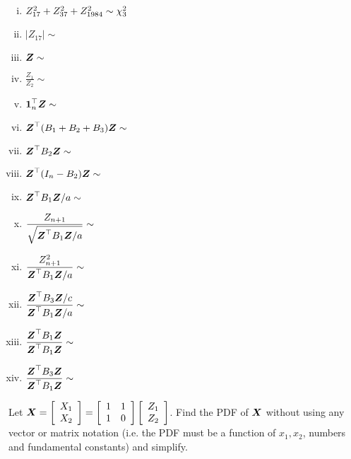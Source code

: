 \documentclass[12pt]{article}
\begin{document}
\begin{multicols}{2}
\begin{enumerate}[i)]
\item $Z_{17}^2 + Z_{37}^2  + Z_{1984}^2 \sim \chi^2_{3}$ \\
\item $|Z_{17}| \sim $ \\
\item $\boldsymbol{Z} \sim$ \\
\item $\displaystyle\frac{Z_1}{Z_2} \sim$ \\
\item $\boldsymbol{1}_n^\top \boldsymbol{Z} \sim$ \\
\item $\boldsymbol{Z}^\top (B_1 + B_2 + B_3) \boldsymbol{Z} \sim$ \\
\item $\boldsymbol{Z}^\top B_2 \boldsymbol{Z} \sim$ \\
\item $\boldsymbol{Z}^\top (I_n - B_2) \boldsymbol{Z} \sim$ \\
\item $\boldsymbol{Z}^\top B_1 \boldsymbol{Z} / a \sim$ \\
\item $\displaystyle\frac{Z_{n+1}}{\sqrt{\boldsymbol{Z}^\top B_1 \boldsymbol{Z} / a}} \sim$ \\
\item $\displaystyle\frac{Z_{n+1}^2}{\boldsymbol{Z}^\top B_1 \boldsymbol{Z} / a} \sim$ \\
\item $\displaystyle\frac{\boldsymbol{Z}^\top B_3 \boldsymbol{Z} / c}{\boldsymbol{Z}^\top B_1 \boldsymbol{Z} / a} \sim$ \\
\item $\displaystyle\frac{\boldsymbol{Z}^\top B_1 \boldsymbol{Z}}{\boldsymbol{Z}^\top B_1 \boldsymbol{Z}} \sim$ \\
\item $\displaystyle\frac{\boldsymbol{Z}^\top B_3 \boldsymbol{Z}}{\boldsymbol{Z}^\top B_1 \boldsymbol{Z}} \sim$ \\
\end{enumerate}
\end{multicols}
\pagebreak

 Let $\boldsymbol{X} = \left[\begin{array}{c} X_1 \\ X_2 \end{array}\right] = \left[\begin{array}{cc} 1 & 1 \\ 1 & 0 \end{array}\right] \left[\begin{array}{c} Z_1 \\ Z_2 \end{array}\right]$. Find the PDF of $\boldsymbol{X}$ without using any vector or matrix notation (i.e. the PDF must be a function of $x_1, x_2$, numbers and fundamental constants) and simplify.
\end{document}

